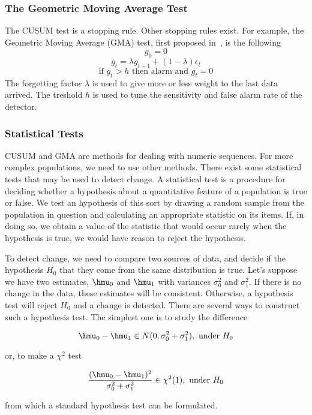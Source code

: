 \subsubsection{The Geometric Moving Average Test}
\label{Ssgma}
The CUSUM test is a stopping rule. Other stopping rules exist. For example, the Geometric Moving Average (GMA) test,
first proposed in~\cite{Roberts}, is the following
$$g_0=0$$
$$g_t= \lambda g_{t-1}+ ( 1- \lambda) \epsilon_t$$
$$\mbox{if } g_t>h \mbox{ then alarm and } g_t=0$$
The forgetting factor $\lambda$ is used to give more or less weight to the last data arrived.
The treshold $h$ is used to tune the sensitivity and false alarm rate %
of the detector.


\subsubsection{Statistical Tests}
\label{Ssstatic}

CUSUM and GMA are methods for dealing with numeric sequences. For more complex populations,
we need to use other methods.
There exist some statistical tests that may be used to detect change.
A statistical test is a procedure for deciding whether a hypothesis 
about a quantitative feature of a population is true or false. We test 
an hypothesis of this sort by drawing a random sample from the population
 in question and calculating an appropriate statistic on its items. 
If, in doing so, we obtain a value of the statistic that would occur
 rarely when the hypothesis is true, we would have reason to reject the hypothesis. 

To detect change, we need to compare two sources of data, and decide if
the hypothesis $H_0$ that they come from the same distribution is true. 
Let's suppose we have two estimates, $\hmu_0$ and $\hmu_1$ with variances
$\sigma_0^2$ and $\sigma_1^2$. If there is no change in the data, 
these estimates will be consistent. Otherwise, a hypothesis test will
reject $H_0$ and a change is detected. There are several ways to construct
such a hypothesis test. The simplest one is to study the difference

$$ \hmu_0 - \hmu_1 \in N(0, \sigma_0^2+ \sigma_1^2), \mbox{ under } H_0$$

or, to make a $\chi^ 2$ test

$$ \frac{(\hmu_0 - \hmu_1)^ 2}{\sigma_0^2+ \sigma_1^2} \in \chi^ 2(1), \mbox{ under } H_0$$

from which a standard hypothesis test can be formulated. 


